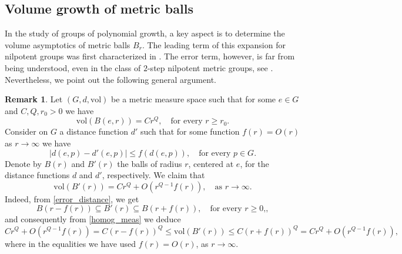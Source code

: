 \documentclass[a4paper,11pt,reqno]{amsart}
\theoremstyle{plain}
\theoremstyle{definition}
\newtheorem{remark}[theorem]{Remark}
\newcommand{\vol}{\mathrm{vol}}
\newcommand{\id}{e}
\newcommand{\coloneq}{\coloneqq}
\begin{document}
 \subsection{Volume growth of metric balls} In the study of groups of polynomial growth, a key aspect is to determine the volume asymptotics of metric balls $B_r$. The leading term of this expansion for nilpotent groups was first characterized in \cite{MR741395}. The error term, however, is far from being understood, even in the class of $2$-step nilpotent metric groups, see \cite{MR3153949}. Nevertheless, we point out the following general argument.
 
 \begin{remark} \label{error_term}
 Let $(G,d, \vol)$ be a metric measure space such that for some $\id\in G$ and $C,Q, r_0>0$ we have
 \begin{equation}\label{homog_meas}
 \vol(B(\id, r))=Cr^Q, \quad \text{for every $r \ge r_0$.}
 \end{equation}
 Consider on $G$ a distance function $d'$ such that for some function $f(r) = O(r)$ as $r \to \infty$ we have
 \begin{equation} \label{error_distance}
 \lvert d(\id,p) - d'(\id,p) \rvert \le f(d(\id,p)), \quad \text{for every $p \in G$}.
 \end{equation}
 Denote by $B(r)$ and $B'(r)$ the balls of radius $r$, centered at $\id$, for the distance functions $d$ and $d'$, respectively. We claim that
 \begin{equation*}
 \vol(B'(r)) = Cr^Q + O(r^{Q-1}f(r)), \quad \text{as $r\to \infty$.}
 \end{equation*}
 Indeed, from \eqref{error_distance}, we get
 \begin{equation*}
 B(r-f(r)) \subseteq B'(r) \subseteq B(r + f(r)), \quad \text{for every $r \ge 0$,},
 \end{equation*}
 and consequently from \eqref{homog_meas} we deduce 
 \begin{equation*}
 Cr^Q + O(r^{Q-1}f(r)) = C(r-f(r))^Q \le \vol(B'(r)) \le C(r+f(r))^Q = Cr^Q + O(r^{Q-1}f(r)),
 \end{equation*}
 where in the equalities we have used $f(r) = O(r)$, as $r \to \infty$. 
 \end{remark}
\end{document}
